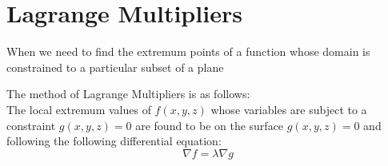 \documentclass{article}
\begin{document}
\section{Lagrange Multipliers}
When we need to find the extremum points of a function whose domain is constrained to a particular subset of a plane

The method of Lagrange Multipliers is as follows:\\
The local extremum values of $f(x,y,z)$ whose variables are subject to a constraint $g(x,y,z) = 0$ are found to be on the surface $g(x,y,z) = 0$ and following the following differential equation:
\[ \nabla f = \lambda \nabla g \]
\end{document}
